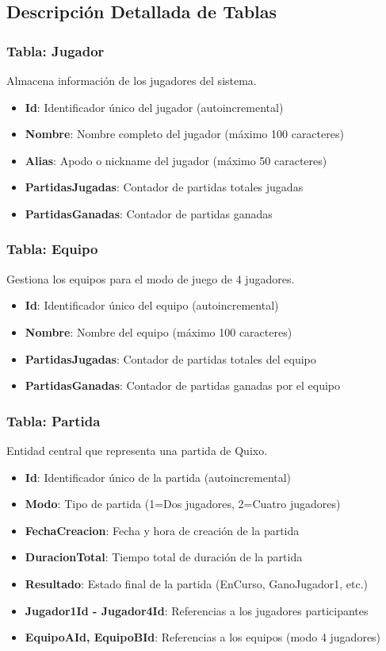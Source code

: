 \documentclass[12pt]{article}
\begin{document}
\subsection*{Descripción Detallada de Tablas}

\subsubsection*{Tabla: Jugador}
Almacena información de los jugadores del sistema.
\begin{itemize}
    \item \textbf{Id}: Identificador único del jugador (autoincremental)
    \item \textbf{Nombre}: Nombre completo del jugador (máximo 100 caracteres)
    \item \textbf{Alias}: Apodo o nickname del jugador (máximo 50 caracteres)
    \item \textbf{PartidasJugadas}: Contador de partidas totales jugadas
    \item \textbf{PartidasGanadas}: Contador de partidas ganadas
\end{itemize}

\subsubsection*{Tabla: Equipo}
Gestiona los equipos para el modo de juego de 4 jugadores.
\begin{itemize}
    \item \textbf{Id}: Identificador único del equipo (autoincremental)
    \item \textbf{Nombre}: Nombre del equipo (máximo 100 caracteres)
    \item \textbf{PartidasJugadas}: Contador de partidas totales del equipo
    \item \textbf{PartidasGanadas}: Contador de partidas ganadas por el equipo
\end{itemize}

\subsubsection*{Tabla: Partida}
Entidad central que representa una partida de Quixo.
\begin{itemize}
    \item \textbf{Id}: Identificador único de la partida (autoincremental)
    \item \textbf{Modo}: Tipo de partida (1=Dos jugadores, 2=Cuatro jugadores)
    \item \textbf{FechaCreacion}: Fecha y hora de creación de la partida
    \item \textbf{DuracionTotal}: Tiempo total de duración de la partida
    \item \textbf{Resultado}: Estado final de la partida (EnCurso, GanoJugador1, etc.)
    \item \textbf{Jugador1Id - Jugador4Id}: Referencias a los jugadores participantes
    \item \textbf{EquipoAId, EquipoBId}: Referencias a los equipos (modo 4 jugadores)
\end{itemize}
\end{document}
